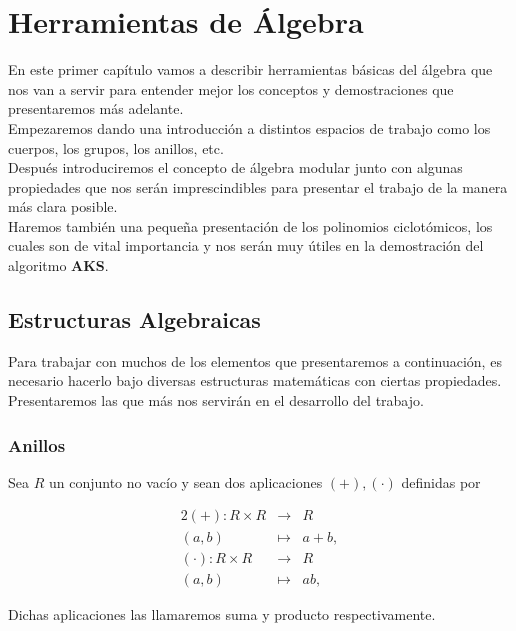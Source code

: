 \chapter{Herramientas de Álgebra}

En este primer capítulo vamos a describir herramientas básicas del álgebra que nos van a servir para entender mejor los conceptos y demostraciones que presentaremos más adelante.\\

Empezaremos dando una introducción a distintos espacios de trabajo como los cuerpos, los grupos, los anillos, etc.\\

Después introduciremos el concepto de álgebra modular junto con algunas propiedades que nos serán imprescindibles para presentar el trabajo de la manera más clara posible.\\

Haremos también una pequeña presentación de los polinomios ciclotómicos, los cuales son de vital importancia y nos serán muy útiles en la demostración del algoritmo \textbf{AKS}.

\section{Estructuras Algebraicas}

Para trabajar con muchos de los elementos que presentaremos a continuación, es necesario hacerlo bajo diversas estructuras matemáticas con ciertas propiedades.\\

Presentaremos las que más nos servirán en el desarrollo del trabajo.

\subsection{Anillos}

Sea $R$ un conjunto no vacío y sean dos aplicaciones $(+), (\cdot)$ definidas por

\begin{alignat*}{2}
	(+): R \times R & \to & R \\
	(a, b) & \mapsto & a+b, \\
	(\cdot): R \times R & \to & R \\
	(a, b) & \mapsto & ab,
\end{alignat*}

Dichas aplicaciones las llamaremos suma y producto respectivamente.

